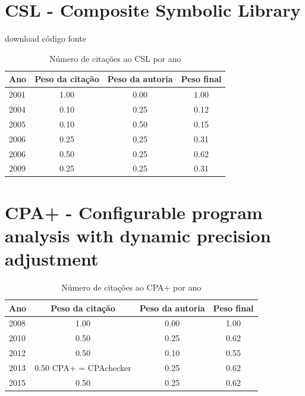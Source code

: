 \section{CSL - Composite Symbolic Library}
\checkmark download
\checkmark código fonte
\begin{table}[H]
\caption{Número de citações ao CSL  por ano}
\centering
\begin{tabular}{| l | c | c | c |}
  \hline
  Ano & Peso da citação & Peso da autoria & Peso final \\
  \hline
  2001
    & 1.00
    & 0.00
    & {\color{blue} 1.00} \\
\hline
  2004
    & 0.10
    & 0.25
    & {\color{red} 0.12} \\
\hline
  2005
    & 0.10
    & 0.50
    & {\color{red} 0.15} \\
\hline
  2006
    & 0.25
    & 0.25
    & {\color{red} 0.31} \\
  2006
    & 0.50
    & 0.25
    & {\color{blue} 0.62} \\
\hline
  2009
    & 0.25
    & 0.25
    & {\color{red} 0.31} \\
\hline
\end{tabular}
\end{table}
\section{CPA+ - Configurable program analysis with dynamic precision adjustment}
\begin{table}[H]
\caption{Número de citações ao CPA+  por ano}
\centering
\begin{tabular}{| l | c | c | c |}
  \hline
  Ano & Peso da citação & Peso da autoria & Peso final \\
  \hline
  2008
    & 1.00
    & 0.00
    & {\color{blue} 1.00} \\
\hline
  2010
    & 0.50
    & 0.25
    & {\color{blue} 0.62} \\
\hline
  2012
    & 0.50
    & 0.10
    & {\color{blue} 0.55} \\
\hline
  2013
    & 0.50
          {\tiny CPA+ = CPAchecker}
    & 0.25
    & {\color{blue} 0.62} \\
\hline
  2015
    & 0.50
    & 0.25
    & {\color{blue} 0.62} \\
\hline
\end{tabular}
\end{table}
